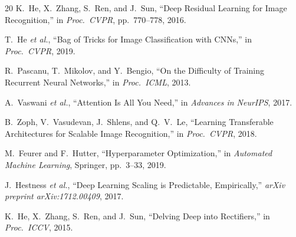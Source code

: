\documentclass[12pt, letterpaper]{article}
\begin{document}
\begin{thebibliography}{20}
K.\ He, X.\ Zhang, S.\ Ren, and J.\ Sun,
``Deep Residual Learning for Image Recognition,''
in \textit{Proc.\ CVPR}, pp.~770--778, 2016.

T.\ He \textit{et al.},
``Bag of Tricks for Image Classification with CNNs,''
in \textit{Proc.\ CVPR}, 2019.

R.\ Pascanu, T.\ Mikolov, and Y.\ Bengio,
``On the Difficulty of Training Recurrent Neural Networks,''
in \textit{Proc.\ ICML}, 2013.

A.\ Vaswani \textit{et al.},
``Attention Is All You Need,''
in \textit{Advances in NeurIPS}, 2017.

B.\ Zoph, V.\ Vasudevan, J.\ Shlens, and Q.~V.\ Le,
``Learning Transferable Architectures for Scalable Image Recognition,''
in \textit{Proc.\ CVPR}, 2018.

M.\ Feurer and F.\ Hutter,
``Hyperparameter Optimization,''
in \textit{Automated Machine Learning}, Springer, pp.~3--33, 2019.

J.\ Hestness \textit{et al.},
``Deep Learning Scaling is Predictable, Empirically,''
\textit{arXiv preprint arXiv:1712.00409}, 2017.

K.\ He, X.\ Zhang, S.\ Ren, and J.\ Sun,
``Delving Deep into Rectifiers,''
in \textit{Proc.\ ICCV}, 2015.

\end{thebibliography}
\end{document}
